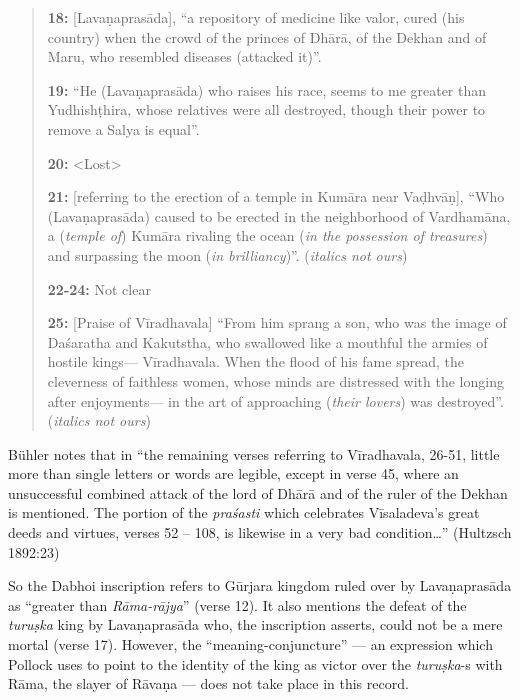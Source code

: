 \begin{quote}
{\bf 18:} [Lavaṇaprasāda], ``a repository of medicine like valor, cured (his country) when the crowd of the princes of Dhārā, of the Dekhan and of Maru, who resembled diseases (attacked it)”.

\smallskip
{\bf  19:} “He (Lavaṇaprasāda) who raises his race, seems to me greater than Yudhishṭhira, whose relatives were all destroyed, though their power to remove a Salya is equal”. 

\smallskip
{\bf 20:} <Lost>

\smallskip
{\bf 21:} [referring to the erection of a temple in Kumāra near Vaḍhvāṇ], “Who (Lavaṇaprasāda) caused to be erected in the neighborhood of Vardhamāna, a ({\sl temple of}) Kumāra rivaling the ocean ({\sl in the possession of treasures}) and surpassing the moon ({\sl in brilliancy})”. ({\sl italics not ours})

\smallskip
{\bf 22-24:} Not clear

\smallskip
{\bf 25:} [Praise of Vīradhavala] “From him sprang a son, who was the image of Daśaratha and Kakutstha, who swallowed like a mouthful the armies of hostile kings— Vīradhavala. When the flood of his fame spread, the cleverness of faithless women, whose minds are distressed with the longing after enjoyments— in the art of approaching ({\sl their lovers}) was destroyed”. ({\sl italics not ours})
\end{quote}

\smallskip
Bühler notes that in “the remaining verses referring to Vīradhavala, 26-51, little more than single letters or words are legible, except in verse 45, where an unsuccessful combined attack of the lord of Dhārā and of the ruler of the Dekhan is mentioned. The portion of the {\sl praśasti} which celebrates Vīsaladeva’s great deeds and virtues, verses 52 – 108, is likewise in a very bad condition…” (Hultzsch 1892:23)

So the Dabhoi inscription refers to Gūrjara kingdom ruled over by Lavaṇaprasāda as “greater than {\sl Rāma-rājya}” (verse 12). It also mentions the defeat of the {\sl turuṣka} king by Lavaṇaprasāda who, the inscription asserts, could not be a mere mortal (verse 17). However, the “meaning-conjuncture” — an expression which Pollock uses to point to the identity of the king as victor over the {\sl turuṣka}-s with Rāma, the slayer of Rāvaṇa — does not take place in this record.  

